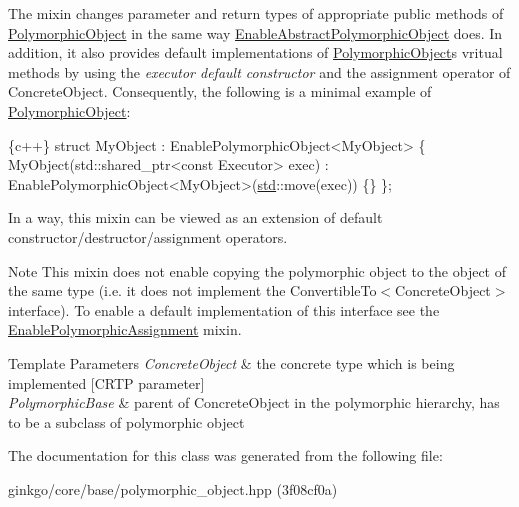 The mixin changes parameter and return types of appropriate public methods of \hyperlink{classgko_1_1PolymorphicObject}{Polymorphic\+Object} in the same way \hyperlink{classgko_1_1EnableAbstractPolymorphicObject}{Enable\+Abstract\+Polymorphic\+Object} does. In addition, it also provides default implementations of \hyperlink{classgko_1_1PolymorphicObject}{Polymorphic\+Object}\textquotesingle{}s vritual methods by using the {\itshape executor default constructor} and the assignment operator of Concrete\+Object. Consequently, the following is a minimal example of \hyperlink{classgko_1_1PolymorphicObject}{Polymorphic\+Object}\+:


\begin{DoxyCode}
\{c++\}
\textcolor{keyword}{struct }MyObject : EnablePolymorphicObject<MyObject> \{
    MyObject(std::shared\_ptr<const Executor> exec)
        : EnablePolymorphicObject<MyObject>(\hyperlink{namespacestd}{std}::move(exec))
    \{\}
\};
\end{DoxyCode}


In a way, this mixin can be viewed as an extension of default constructor/destructor/assignment operators.

\begin{DoxyNote}{Note}
This mixin does not enable copying the polymorphic object to the object of the same type (i.\+e. it does not implement the Convertible\+To$<$\+Concrete\+Object$>$ interface). To enable a default implementation of this interface see the \hyperlink{classgko_1_1EnablePolymorphicAssignment}{Enable\+Polymorphic\+Assignment} mixin.
\end{DoxyNote}

\begin{DoxyTemplParams}{Template Parameters}
{\em Concrete\+Object} & the concrete type which is being implemented \mbox{[}C\+R\+TP parameter\mbox{]} \\
\hline
{\em Polymorphic\+Base} & parent of Concrete\+Object in the polymorphic hierarchy, has to be a subclass of polymorphic object \\
\hline
\end{DoxyTemplParams}


The documentation for this class was generated from the following file\+:\begin{DoxyCompactItemize}
\item 
ginkgo/core/base/polymorphic\+\_\+object.\+hpp (3f08cf0a)\end{DoxyCompactItemize}
